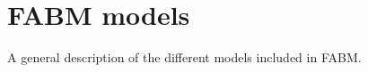 
\chapter{FABM models \label{chap:models}}

A general description of the different models included in FABM.















